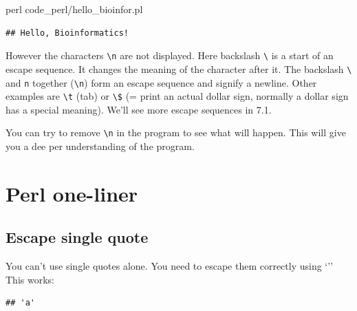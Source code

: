 \documentclass[]{book}
\makeatletter
\newenvironment{Shaded}{\begin{snugshade}}{\end{snugshade}}
\newcommand{\BuiltInTok}[1]{#1}
\newcommand{\DataTypeTok}[1]{\textcolor[rgb]{0.13,0.29,0.53}{#1}}
\newcommand{\FunctionTok}[1]{\textcolor[rgb]{0.00,0.00,0.00}{#1}}
\newcommand{\KeywordTok}[1]{\textcolor[rgb]{0.13,0.29,0.53}{\textbf{#1}}}
\newcommand{\NormalTok}[1]{#1}
\newcommand{\StringTok}[1]{\textcolor[rgb]{0.31,0.60,0.02}{#1}}
\newenvironment{kframe}{%
\medskip{}
\setlength{\fboxsep}{.8em}
 \def\at@end@of@kframe{}%
 \ifinner\ifhmode%
  \def\at@end@of@kframe{\end{minipage}}%
  \begin{minipage}{\columnwidth}%
 \fi\fi%
 \def\FrameCommand##1{\hskip\@totalleftmargin \hskip-\fboxsep
 \colorbox{shadecolor}{##1}\hskip-\fboxsep
     \hskip-\linewidth \hskip-\@totalleftmargin \hskip\columnwidth}%
 \MakeFramed {\advance\hsize-\width
   \@totalleftmargin\z@ \linewidth\hsize
   \@setminipage}}%
 {\par\unskip\endMakeFramed%
 \at@end@of@kframe}
\renewenvironment{Shaded}{\begin{kframe}}{\end{kframe}}
\makeatother
\begin{document}
\begin{Shaded}
\begin{Highlighting}[]
\FunctionTok{perl}\NormalTok{ code_perl/hello_bioinfor.pl}
\end{Highlighting}
\end{Shaded}

\begin{verbatim}
## Hello, Bioinformatics!
\end{verbatim}

However the characters \texttt{\textbackslash{}n} are not displayed. Here backslash \texttt{\textbackslash{}} is a start of an escape sequence. It changes the meaning of the character after it. The backslash \texttt{\textbackslash{}} and \texttt{n} together (\texttt{\textbackslash{}n}) form an escape sequence and signify a newline. Other examples are \texttt{\textbackslash{}t} (tab) or \texttt{\textbackslash{}\$} (= print an actual dollar sign, normally a dollar sign has a special meaning). We'll see more escape sequences in 7.1.

You can try to remove \texttt{\textbackslash{}n} in the program to see what will happen. This will give you a dee per understanding of the program.

\hypertarget{perl-one-liner}{%
\chapter{Perl one-liner}\label{perl-one-liner}}

\hypertarget{escape-single-quote}{%
\section{Escape single quote}\label{escape-single-quote}}

You can't use single quotes alone. You need to escape them correctly using `'' This works:

\begin{Shaded}
\end{Shaded}

\begin{verbatim}
## 'a'
\end{verbatim}
\end{document}
